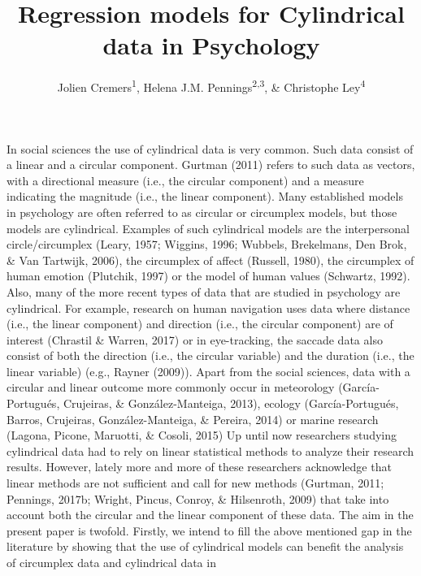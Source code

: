 \documentclass[man,mask]{apa6}
\title{Regression models for Cylindrical data in Psychology}
\author{Jolien Cremers\textsuperscript{1}, Helena J.M. Pennings\textsuperscript{2,3}, \& Christophe Ley\textsuperscript{4}}
\date{}
\affiliation{
\vspace{0.5cm}
\textsuperscript{1} Department of Biostatistics, University of Copenhagen\\\textsuperscript{2} TNO\\\textsuperscript{3} Department of Education, Utrecht University\\\textsuperscript{4} Department of Applied Mathematics, Computer Science and Statistics, Ghent University}
\DeclareRobustCommand{\VAN}[3]{#2}
\DeclareRobustCommand{\DEN}[3]{#2}
\begin{document}
\maketitle

\vspace{-0.75cm}

In social sciences the use of cylindrical data is very common. Such data consist
of a linear and a circular component. Gurtman (2011) refers to such data
as vectors, with a directional measure (i.e., the circular component) and a
measure indicating the magnitude (i.e., the linear component). Many established
models in psychology are often referred to as circular or circumplex models, but
those models are cylindrical. Examples of such cylindrical models are the
interpersonal circle/circumplex
(Leary, 1957; Wiggins, 1996; Wubbels, Brekelmans, \DEN{Brok}{Den}{den} Brok, \& \VAN{Tartwijk}{Van}{van} Tartwijk, 2006), the circumplex of
affect (Russell, 1980), the circumplex of human emotion
(Plutchik, 1997) or the model of human values (Schwartz, 1992).
\newline
\indent Also, many of the more recent types of data that are studied in psychology are
cylindrical. For example, research on human navigation uses data where distance
(i.e., the linear component) and direction (i.e., the circular component) are of
interest (Chrastil \& Warren, 2017) or in eye-tracking, the saccade data also
consist of both the direction (i.e., the circular variable) and the duration
(i.e., the linear variable) (e.g., Rayner (2009)). Apart from the social
sciences, data with a circular and linear outcome more commonly occur in
meteorology (García-Portugués, Crujeiras, \& González-Manteiga, 2013), ecology (García-Portugués, Barros, Crujeiras, González-Manteiga, \& Pereira, 2014) or
marine research (Lagona, Picone, Maruotti, \& Cosoli, 2015)
\newline
\indent Up until now researchers studying cylindrical data had to rely on linear
statistical methods to analyze their research results. However, lately more and more
of these researchers acknowledge that linear methods are not sufficient and call
for new methods (Gurtman, 2011; Pennings, 2017b; Wright, Pincus, Conroy, \& Hilsenroth, 2009) that take into account both the circular and the linear
component of these data.
\newline
\indent The aim in the present paper is twofold. Firstly, we intend to fill
the above mentioned gap in the literature by showing that the use of cylindrical
models can benefit the analysis of circumplex data and cylindrical data in
\end{document}
